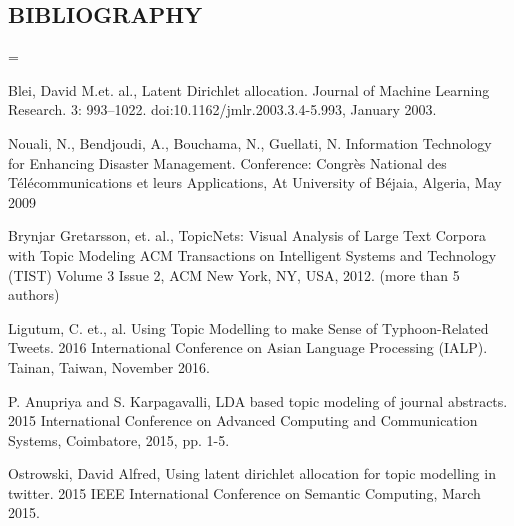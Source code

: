 \clearpage
    \vspace*{\fill}
        \begin{center}
            \begin{minipage}{.6\textwidth}
                
                    \section{BIBLIOGRAPHY}
                
            \end{minipage}
        \end{center}
    \vfill
\clearpage

\newpage
\begin{singlespace}
	\hangindent=\parindent
	
	Blei, David M.et. al., Latent Dirichlet allocation. Journal of Machine Learning Research. 3: 993–1022. doi:10.1162/jmlr.2003.3.4-5.993, January 2003.\par
	Nouali, N., Bendjoudi, A., Bouchama, N., Guellati, N. Information Technology for Enhancing Disaster Management. Conference: Congrès National des Télécommunications et leurs Applications, At University of Béjaia, Algeria, May 2009\par
	Brynjar Gretarsson, et. al., TopicNets: Visual Analysis of Large Text Corpora with Topic Modeling ACM Transactions on Intelligent Systems and Technology (TIST) Volume 3 Issue 2, ACM New York, NY, USA, 2012. (more than 5 authors)\par
	Ligutum, C. et., al. Using Topic Modelling to make Sense of Typhoon-Related Tweets. 2016 International Conference on Asian Language Processing (IALP). Tainan, Taiwan, November 2016.\par
	P. Anupriya and S. Karpagavalli, LDA based topic modeling of journal abstracts. 2015 International Conference on Advanced Computing and Communication Systems, Coimbatore, 2015, pp. 1-5.\par
	Ostrowski, David Alfred, Using latent dirichlet allocation for topic modelling in twitter. 2015 IEEE International Conference on Semantic Computing, March 2015.\par
	
\end{singlespace}


